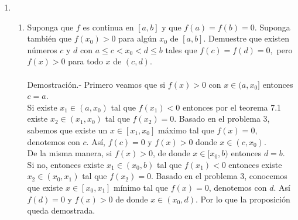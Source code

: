\begin{enumerate}[\bfseries 1.]
\begin{enumerate}[\bfseries (a)]
	\end{enumerate}

    \item 
	\begin{enumerate}[\bfseries (a)]

	    \item Suponga que $f$ es continua en $[a,b]$ y que $f(a)=f(b)=0$. Suponga también que $f(x_0)>0$ para algún $x_0$ de $[a,b]$. Demuestre que existen números $c$ y $d$ con $a\leq c< x_0 < d \leq b$ tales que $f(c)=f(d)=0,$ pero $f(x)>0$ para todo $x$ de $(c,d)$.\\\\
		Demostración.-\; Primero veamos que si $f(x)>0$ con $x\in (a,x_0]$ entonces $c=a$.\\
		Si existe $x_1\in (a,x_0)$ tal que $f(x_1)<0$ entonces por el teorema 7.1 existe $x_2\in (x_1,x_0)$ tal que $f(x_2)=0$. Basado en el problema 3, sabemos que existe un  $x\in [x_1,x_0]$ máximo tal que $f(x)=0$, denotemos con $c$. Así, $f(c)=0$ y $f(x)>0$ donde $x\in (c,x_0)$.\\
		De la misma manera, si $f(x)>0$, de donde $x\in [x_0,b)$ entonces $d=b$. Si no, entonces existe $x_1 \in (x_0,b)$ tal que $f(x_1)<0$ entonces existe $x_2 \in (x_0,x_1)$ tal que $f(x_2)=0$. Basado en el problema 3, conocemos que existe $x\in [x_0,x_1]$ mínimo tal que $f(x)=0$, denotemos con $d$. Así $f(d)=0$ y $f(x)>0$ de donde $x\in (x_0,d)$. Por lo que la proposición queda demostrada.\\\\
		\begin{center}
		\end{center}
		\vspace{.5cm}


\end{enumerate}
\end{enumerate}
